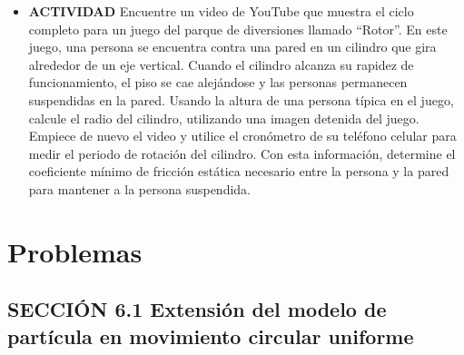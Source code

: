 \documentclass[11pt,a4paper]{article}
\begin{document}
\begin{itemize}
    \item[\textbf{3.}] \textbf{ACTIVIDAD} Encuentre un video de YouTube que muestra el ciclo completo para un juego del parque de diversiones llamado ``Rotor''. En este juego, una persona se encuentra contra una pared en un cilindro que gira alrededor de un eje vertical. Cuando el cilindro alcanza su rapidez de funcionamiento, el piso se cae alejándose y las personas permanecen suspendidas en la pared. Usando la altura de una persona típica en el juego, calcule el radio del cilindro, utilizando una imagen detenida del juego. Empiece de nuevo el video y utilice el cronómetro de su teléfono celular para medir el periodo de rotación del cilindro. Con esta información, determine el coeficiente mínimo de fricción estática necesario entre la persona y la pared para mantener a la persona suspendida.
    \vspace*{8cm}
\end{itemize}

\newpage

\section*{Problemas}

\subsection*{SECCIÓN 6.1 Extensión del modelo de partícula en movimiento circular uniforme}
\end{document}
